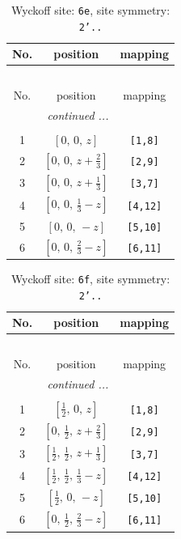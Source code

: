 \documentclass[fleqn,8pt]{jsarticle}
\begin{document}
\begin{longtable}{ccc}
\caption{Wyckoff site: {\tt 6e}, site symmetry: {\tt 2'..}}
 \\
 \hline \hline
No. & position & mapping \\ \hline \endfirsthead

\multicolumn{2}{l}{\tablename\ \thetable{}} \\
 \hline \hline
No. & position & mapping \\ \hline \endhead

 \hline \hline
\multicolumn{2}{r}{\footnotesize\it continued ...} \\ \endfoot

 \hline \hline
\multicolumn{2}{r}{} \\ \endlastfoot

1 & $\left[ 0,\, 0,\, z \right]$ & {\tt [1,8]} \\ \hline
2 & $\left[ 0,\, 0,\, z + \frac{2}{3} \right]$ & {\tt [2,9]} \\ \hline
3 & $\left[ 0,\, 0,\, z + \frac{1}{3} \right]$ & {\tt [3,7]} \\ \hline
4 & $\left[ 0,\, 0,\, \frac{1}{3} - z \right]$ & {\tt [4,12]} \\ \hline
5 & $\left[ 0,\, 0,\, - z \right]$ & {\tt [5,10]} \\ \hline
6 & $\left[ 0,\, 0,\, \frac{2}{3} - z \right]$ & {\tt [6,11]} \\
\end{longtable}
\renewcommand{\arraystretch}{1.2}
\begin{longtable}{ccc}
\caption{Wyckoff site: {\tt 6f}, site symmetry: {\tt 2'..}}
 \\
 \hline \hline
No. & position & mapping \\ \hline \endfirsthead

\multicolumn{2}{l}{\tablename\ \thetable{}} \\
 \hline \hline
No. & position & mapping \\ \hline \endhead

 \hline \hline
\multicolumn{2}{r}{\footnotesize\it continued ...} \\ \endfoot

 \hline \hline
\multicolumn{2}{r}{} \\ \endlastfoot

1 & $\left[ \frac{1}{2},\, 0,\, z \right]$ & {\tt [1,8]} \\ \hline
2 & $\left[ 0,\, \frac{1}{2},\, z + \frac{2}{3} \right]$ & {\tt [2,9]} \\ \hline
3 & $\left[ \frac{1}{2},\, \frac{1}{2},\, z + \frac{1}{3} \right]$ & {\tt [3,7]} \\ \hline
4 & $\left[ \frac{1}{2},\, \frac{1}{2},\, \frac{1}{3} - z \right]$ & {\tt [4,12]} \\ \hline
5 & $\left[ \frac{1}{2},\, 0,\, - z \right]$ & {\tt [5,10]} \\ \hline
6 & $\left[ 0,\, \frac{1}{2},\, \frac{2}{3} - z \right]$ & {\tt [6,11]} \\
\end{longtable}
\end{document}
